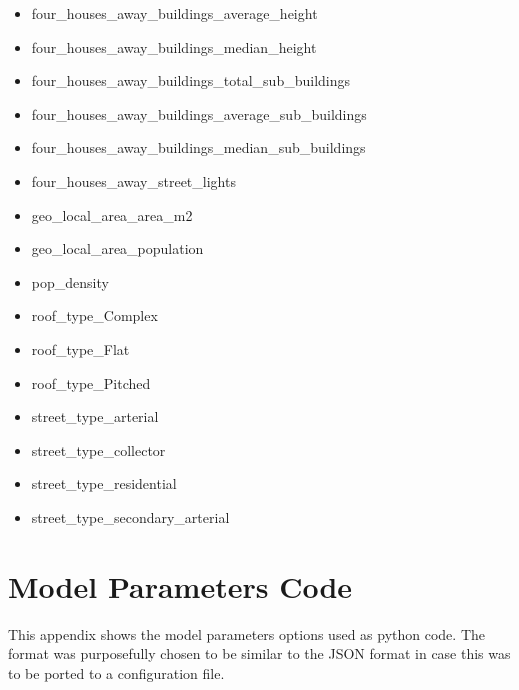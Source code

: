 \begin{itemize}
  \item four\_houses\_away\_buildings\_average\_height
  \item four\_houses\_away\_buildings\_median\_height
  \item four\_houses\_away\_buildings\_total\_sub\_buildings
  \item four\_houses\_away\_buildings\_average\_sub\_buildings
  \item four\_houses\_away\_buildings\_median\_sub\_buildings
  \item four\_houses\_away\_street\_lights
  \item geo\_local\_area\_area\_m2
  \item geo\_local\_area\_population
  \item pop\_density
  \item roof\_type\_Complex
  \item roof\_type\_Flat
  \item roof\_type\_Pitched
  \item street\_type\_arterial
  \item street\_type\_collector
  \item street\_type\_residential
  \item street\_type\_secondary\_arterial
\end{itemize}

\chapter{Model Parameters Code}\label{app:model_parameters}

This appendix shows the model parameters options used as python code. The format was purposefully chosen to be similar to the JSON format in case this was to be ported to a configuration file.

